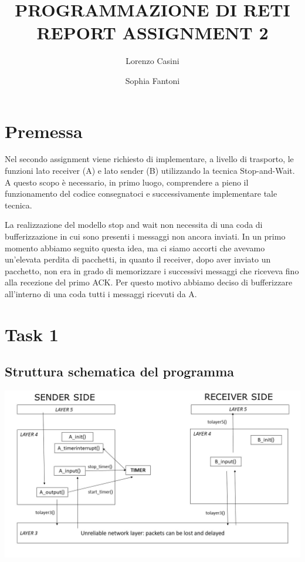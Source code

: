 \documentclass[a4paper]{article}
\begin{document}
\author{Lorenzo Casini \and Sophia Fantoni}
\title{PROGRAMMAZIONE DI RETI \\ REPORT ASSIGNMENT 2}
\maketitle

\newpage

\tableofcontents	%

\newpage

\section{Premessa}
Nel secondo assignment viene richiesto di implementare, a livello di trasporto, le funzioni lato receiver (A) e lato sender (B) utilizzando la tecnica Stop-and-Wait. A questo scopo è necessario, in primo luogo, comprendere a pieno il funzionamento del codice consegnatoci e successivamente implementare tale tecnica. 
\par La realizzazione del modello stop and wait non necessita di una coda di bufferizzazione in cui sono presenti i messaggi non ancora inviati. In un primo momento abbiamo seguito questa idea, ma ci siamo accorti che avevamo un'elevata perdita di pacchetti, in quanto il receiver, dopo aver inviato un pacchetto, non era in grado di memorizzare i successivi messaggi che riceveva fino alla recezione del primo ACK. Per questo motivo abbiamo deciso di bufferizzare all'interno di una coda tutti i messaggi ricevuti da A.

\section{Task 1}

\subsection{Struttura schematica del programma}
\includegraphics[width=\linewidth]{schema.jpg}
\end{document}
